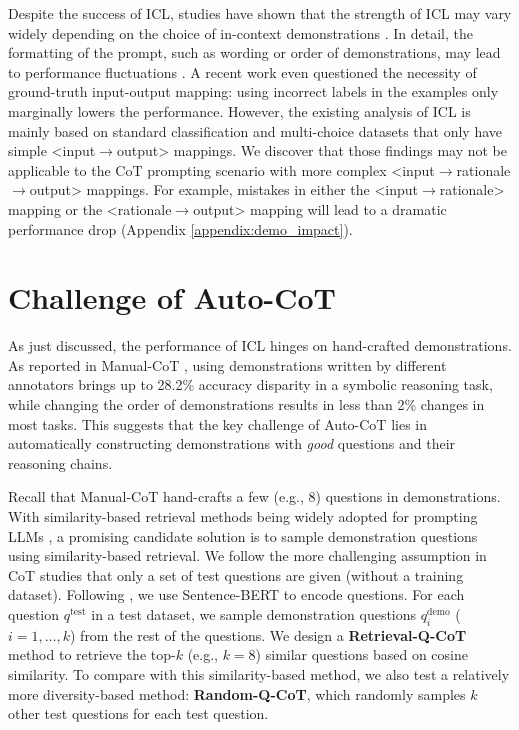 Despite the success of ICL, studies \citep{liu2022makes,lu2022fantastically} have shown that the strength of ICL may vary widely depending on the choice of in-context demonstrations \citep{liu2022few}. In detail, the formatting of the prompt, such as wording or order of demonstrations, may lead to performance fluctuations \citep{webson2021prompt,zhao2021calibrate}. A recent work \citep{min2022rethinking} even questioned the necessity of ground-truth input-output mapping: using incorrect
labels in the examples only marginally lowers the performance. However, the existing analysis of ICL is mainly based on standard classification and multi-choice datasets that only have simple <input$\rightarrow$output> mappings. We discover that those findings may not be applicable to the CoT prompting scenario with more complex <input$\rightarrow$rationale$\rightarrow$output> mappings. 
For example, mistakes in either the <input$\rightarrow$rationale> mapping or the <rationale$\rightarrow$output> mapping will lead to a dramatic performance drop (Appendix \ref{appendix:demo_impact}).

\section{Challenge of Auto-CoT}\label{sec:prelim}

As just discussed, the performance of ICL hinges on hand-crafted demonstrations. 
As reported in Manual-CoT \citep{cot_wei}, using demonstrations written by different annotators brings up to 28.2\% accuracy disparity in a symbolic reasoning task, while changing the order of demonstrations results in less than 2\% changes in most tasks.
This suggests that the key challenge of Auto-CoT lies in automatically constructing demonstrations with \emph{good} questions and their reasoning chains.

Recall that Manual-CoT hand-crafts a few (e.g., 8) questions in demonstrations. With similarity-based retrieval methods being widely adopted for prompting LLMs \citep{rubin2021learning,Su2022SelectiveAM}, a promising candidate solution is to sample demonstration questions using similarity-based retrieval. We follow the more challenging assumption in CoT studies \citep{cot_wei,kojima2022large} that only a set of test questions are given (without a training dataset). Following \citet{liu2022makes}, we use Sentence-BERT \citep{reimers-2019-sentence-bert} to encode questions. 
For each question $q^\text{test}$ in a test dataset, we sample demonstration questions $q^\text{demo}_i$ ($i = 1, \ldots, k$) from the rest of the questions. We design a \textbf{Retrieval-Q-CoT} method to retrieve the top-$k$ (e.g., $k=8$) similar questions based on cosine similarity. To compare with this similarity-based method, we also test a relatively more diversity-based method: \textbf{Random-Q-CoT}, which randomly samples $k$ other test questions for each test question. 


